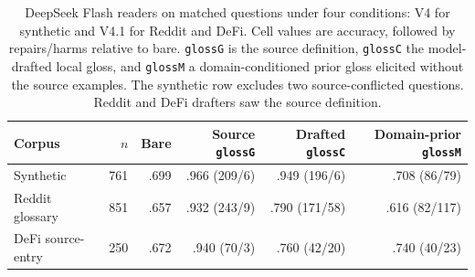 \begin{table}[h]\centering\footnotesize
\caption{DeepSeek Flash readers on matched questions under four conditions: V4 for synthetic and V4.1 for Reddit and DeFi. Cell values are accuracy, followed by repairs/harms relative to bare. \texttt{glossG} is the source definition, \texttt{glossC} the model-drafted local gloss, and \texttt{glossM} a domain-conditioned prior gloss elicited without the source examples. The synthetic row excludes two source-conflicted questions. Reddit and DeFi drafters saw the source definition.}
\label{tab:definition-arms}
\begin{tabular}{@{}lrrrrr@{}}\toprule
Corpus & $n$ & Bare & Source \texttt{glossG} & Drafted \texttt{glossC} & Domain-prior \texttt{glossM}\\\midrule
Synthetic & 761 & .699 & .966 (209/6) & .949 (196/6) & .708 (86/79)\\
Reddit glossary & 851 & .657 & .932 (243/9) & .790 (171/58) & .616 (82/117)\\
DeFi source-entry & 250 & .672 & .940 (70/3) & .760 (42/20) & .740 (40/23)\\\bottomrule
\end{tabular}
\end{table}
